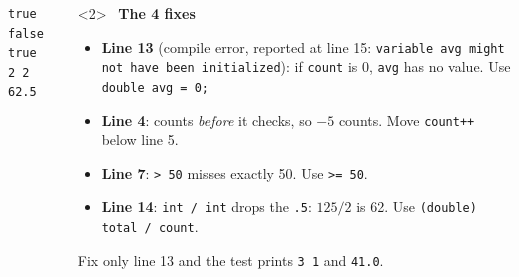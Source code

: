 \documentclass[aspectratio=169]{beamer}
\newcommand{\code}[1]{\texttt{#1}}
\newcommand{\goodlabel}[1]{\textcolor{goodgreen}{\ding{51}~\textbf{#1}}}
\begin{document}
\begin{frame}
\begin{columns}[T,onlytextwidth]
\begin{onlyenv}
\begin{lstlisting}[basicstyle=\ttfamily\fontsize{6.8}{7.9}\selectfont]
true false true
2 2
62.5
\end{lstlisting}
    \end{onlyenv}
    \begin{onlyenv}<2>
    \goodlabel{The 4 fixes}
    \begin{itemize}[itemsep=0.25em, leftmargin=1em]
      \footnotesize
      \item \textbf{Line 13} (compile error, reported at line 15:
            \code{variable avg might not have been initialized}): if
            \code{count} is 0, \code{avg} has no value. Use \code{double avg = 0;}
      \item \textbf{Line 4}: counts \emph{before} it checks, so $-5$ counts. Move
            \code{count++} below line 5.
      \item \textbf{Line 7}: \code{> 50} misses exactly 50. Use \code{>= 50}.
      \item \textbf{Line 14}: \code{int / int} drops the \code{.5}: $125 / 2$ is
            62. Use \code{(double) total / count}.
    \end{itemize}
    {\footnotesize Fix only line 13 and the test prints \code{3 1} and
    \code{41.0}.}
    \end{onlyenv}
  \end{columns}
\end{frame}
\end{document}
